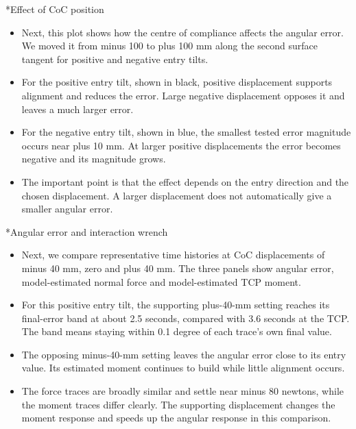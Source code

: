 \documentclass[12pt,a4paper]{article}
\makeatletter
\renewcommand\section{\@startsection{section}{1}{0pt}{14pt}{6pt}{\normalfont\Large\bfseries\color{navy}}}
\makeatother
\begin{document}
\section*{Effect of CoC position}
\begin{itemize}
\item Next, this plot shows how the centre of compliance affects the angular error. We moved it from minus 100 to plus 100 mm along the second surface tangent for positive and negative entry tilts.
\item For the positive entry tilt, shown in black, positive displacement supports alignment and reduces the error. Large negative displacement opposes it and leaves a much larger error.
\item For the negative entry tilt, shown in blue, the smallest tested error magnitude occurs near plus 10 mm. At larger positive displacements the error becomes negative and its magnitude grows.
\item The important point is that the effect depends on the entry direction and the chosen displacement. A larger displacement does not automatically give a smaller angular error.
\end{itemize}

\section*{Angular error and interaction wrench}
\begin{itemize}
\item Next, we compare representative time histories at CoC displacements of minus 40 mm, zero and plus 40 mm. The three panels show angular error, model-estimated normal force and model-estimated TCP moment.
\item For this positive entry tilt, the supporting plus-40-mm setting reaches its final-error band at about 2.5 seconds, compared with 3.6 seconds at the TCP. The band means staying within 0.1 degree of each trace's own final value.
\item The opposing minus-40-mm setting leaves the angular error close to its entry value. Its estimated moment continues to build while little alignment occurs.
\item The force traces are broadly similar and settle near minus 80 newtons, while the moment traces differ clearly. The supporting displacement changes the moment response and speeds up the angular response in this comparison.
\end{itemize}
\end{document}
